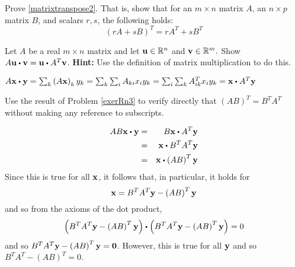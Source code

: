 \begin{enumialphparenastyle}
\begin{ex} Prove \ref{matrixtranspose2}. That is, show that for an $m \times n$ matrix $A$, an $n \times p$ matrix $B$, and scalars $r, s$, the following holds:
\[
\left( rA + sB \right) ^T = rA^{T} + sB^{T}
\]
\end{ex}

\begin{ex} \label{exerRn3}  Let $A$ be a real $m\times n$ matrix and
let ${\bf u}\in \mathbb{R}^{n}$ and ${\bf v}\in \mathbb{R}^{m}.$ Show 
$A\vect{u}\dotprod \vect{v}=\vect{u}\dotprod A^{T}\vect{v}$. 
\textbf{Hint:} Use the definition of matrix
multiplication to do this.
\begin{sol}
$A\vect{x}\dotprod \vect{y}=\sum_{k}\left( A\vect{x}
\right) _{k}y_{k}=\sum_{k}\sum_{i}A_{ki}x_{i}y_{k}=\sum_{i}
\sum_{k}A_{ik}^{T}x_{i}y_{k}= \vect{x} \dotprod A^{T}\vect{y} $
\end{sol}
\end{ex}

\begin{ex} Use the result of Problem \ref{exerRn3} to verify directly
that $\left( AB\right) ^{T}=B^{T}A^{T}$ without making any reference to
subscripts.
\begin{sol}
\begin{eqnarray*}
 AB\vect{x} \dotprod \vect{y} &=& B\vect{x} \dotprod A^{T}\vect{y} \\ 
&=& \vect{x}\dotprod B^{T}A^{T}\vect{y} \\
&=& \vect{x}\dotprod \left( AB\right) ^{T} \vect{y}
\end{eqnarray*}
Since this is true for all ${\bf x}$, it follows that, in particular, it
holds for
\[
{\bf x}=B^{T}A^{T}{\bf y}-\left( AB\right) ^{T}{\bf y}
\]
and so from the axioms of the dot product,
\[
\left( B^{T}A^{T}\vect{y}-\left( AB\right) ^{T}\vect{y}\right) \dotprod \left(B^{T}A^{T}
\vect{y}-\left( AB\right) ^{T}\vect{y}\right) =0
\]
and so $B^{T}A^{T}{\bf y}-\left( AB\right) ^{T}{\bf y}={\bf 0}$. However,
this is true for all ${\bf y}$ and so $B^{T}A^{T}-\left(
AB\right) ^{T}=0.$
\end{sol}
\end{ex}
 
\end{enumialphparenastyle}